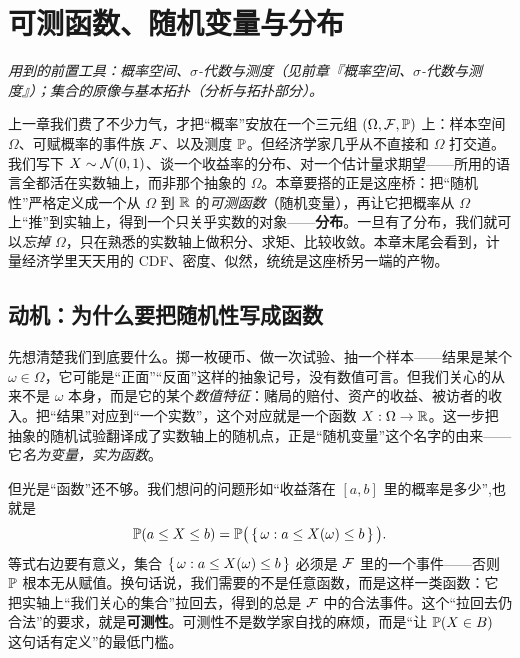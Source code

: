 \chapter{可测函数、随机变量与分布}
\label{ch:randomvar}

\noindent\emph{用到的前置工具：概率空间、$\sigma$-代数与测度（见前章『概率空间、$\sigma$-代数与测度』）；集合的原像与基本拓扑（分析与拓扑部分）。}
\medskip

上一章我们费了不少力气，才把``概率''安放在一个三元组 $(\Omega,\mathcal{F},\mathbb{P})$ 上：样本空间 $\Omega$、可赋概率的事件族 $\mathcal{F}$、以及测度 $\mathbb{P}$。但经济学家几乎从不直接和 $\Omega$ 打交道。我们写下 $X\sim\mathcal{N}(0,1)$、谈一个收益率的分布、对一个估计量求期望——所用的语言全都活在实数轴上，而非那个抽象的 $\Omega$。本章要搭的正是这座桥：把``随机性''严格定义成一个从 $\Omega$ 到 $\mathbb{R}$ 的\emph{可测函数}（随机变量），再让它把概率从 $\Omega$ 上``推''到实轴上，得到一个只关乎实数的对象——\textbf{分布}。一旦有了分布，我们就可以\emph{忘掉 $\Omega$}，只在熟悉的实数轴上做积分、求矩、比较收敛。本章末尾会看到，计量经济学里天天用的 CDF、密度、似然，统统是这座桥另一端的产物。

\section{动机：为什么要把随机性写成函数}
\label{sec:randomvar-1}

先想清楚我们到底要什么。掷一枚硬币、做一次试验、抽一个样本——结果是某个 $\omega\in\Omega$，它可能是``正面''``反面''这样的抽象记号，没有数值可言。但我们关心的从来不是 $\omega$ 本身，而是它的某个\emph{数值特征}：赌局的赔付、资产的收益、被访者的收入。把``结果''对应到``一个实数''，这个对应就是一个函数 $X:\Omega\to\mathbb{R}$。这一步把抽象的随机试验翻译成了实数轴上的随机点，正是``随机变量''这个名字的由来——它\emph{名为变量，实为函数}。

但光是``函数''还不够。我们想问的问题形如``收益落在 $[a,b]$ 里的概率是多少'',也就是
\[
    \mathbb{P}\!\left(a\le X\le b\right)=\mathbb{P}\big(\left\{\,\omega : a\le X(\omega)\le b\,\right\}\big).
\]
等式右边要有意义，集合 $\left\{\,\omega : a\le X(\omega)\le b\,\right\}$ 必须是 $\mathcal{F}$ 里的一个事件——否则 $\mathbb{P}$ 根本无从赋值。换句话说，我们需要的不是任意函数，而是这样一类函数：它把实轴上``我们关心的集合''拉回去，得到的总是 $\mathcal{F}$ 中的合法事件。这个``拉回去仍合法''的要求，就是\textbf{可测性}。可测性不是数学家自找的麻烦，而是``让 $\mathbb{P}\!\left(X\in B\right)$ 这句话有定义''的最低门槛。


